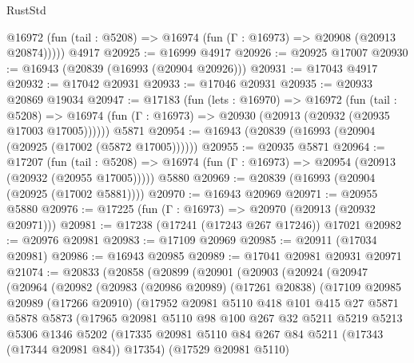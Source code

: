 \begin{lexlean}{RustStd}
\begin{coremodule}
      @16972 (fun (tail : @5208) => @16974 (fun (Γ : @16973) => @20908 (@20913 @20874)))))
    @4917
@20925 := @16999 @4917
@20926 := @20925 @17007
@20930 := @16943 (@20839 (@16993 (@20904 @20926)))
@20931 := @17043 @4917
@20932 := @17042 @20931
@20933 := @17046 @20931
@20935 := @20933 @20869 @19034
@20947 := @17183
    (fun (lets : @16970) =>
    @16972
      (fun (tail : @5208) =>
      @16974 (fun (Γ : @16973) => @20930 (@20913 (@20932 (@20935 @17003 @17005))))))
    @5871
@20954 := @16943 (@20839 (@16993 (@20904 (@20925 (@17002 (@5872 @17005))))))
@20955 := @20935 @5871
@20964 := @17207
    (fun (tail : @5208) => @16974 (fun (Γ : @16973) => @20954 (@20913 (@20932 (@20955 @17005)))))
    @5880
@20969 := @20839 (@16993 (@20904 (@20925 (@17002 @5881))))
@20970 := @16943 @20969
@20971 := @20955 @5880
@20976 := @17225 (fun (Γ : @16973) => @20970 (@20913 (@20932 @20971)))
@20981 := @17238 (@17241 (@17243 @267 @17246)) @17021
@20982 := @20976 @20981
@20983 := @17109 @20969
@20985 := @20911 (@17034 @20981)
@20986 := @16943 @20985
@20989 := @17041 @20981 @20931 @20971
@21074 := @20833
    (@20858
      (@20899
        (@20901
          (@20903
            (@20924
              (@20947
                (@20964
                  (@20982
                    (@20983
                      (@20986 @20989)
                      (@17261 @20838)
                      (@17109
                        @20985
                        @20989
                        (@17266 @20910)
                        (@17952
                          @20981
                          @5110
                          @418
                          @101
                          @415
                          @27
                          @5871
                          @5878
                          @5873
                          (@17965
                            @20981
                            @5110
                            @98
                            @100
                            @267
                            @32
                            @5211
                            @5219
                            @5213
                            @5306
                            @1346
                            @5202
                            (@17335
                              @20981
                              @5110
                              @84
                              @267
                              @84
                              @5211
                              (@17343 (@17344 @20981 @84))
                              @17354)
                            (@17529 @20981 @5110)

\end{coremodule}
\end{lexlean}
